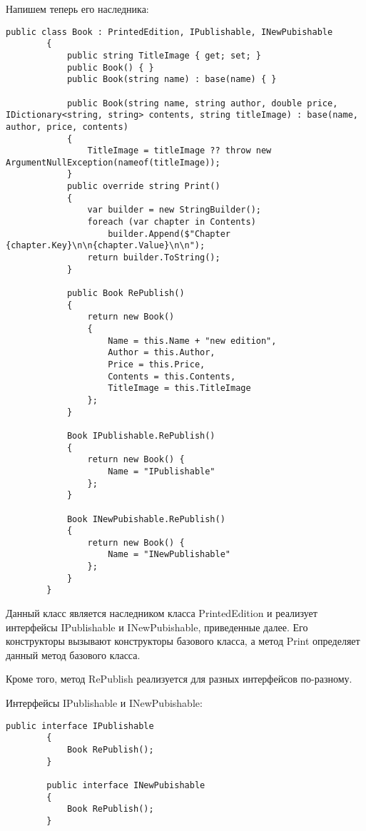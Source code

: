 \documentclass[a4paper,14pt]{extarticle}
\begin{document}
    Напишем теперь его наследника:

    \begin{lstlisting}[language={[Sharp]C}]
        public class Book : PrintedEdition, IPublishable, INewPubishable
        {
            public string TitleImage { get; set; }
            public Book() { }
            public Book(string name) : base(name) { } 

            public Book(string name, string author, double price, IDictionary<string, string> contents, string titleImage) : base(name, author, price, contents) 
            {
                TitleImage = titleImage ?? throw new ArgumentNullException(nameof(titleImage));
            }
            public override string Print()
            {
                var builder = new StringBuilder();
                foreach (var chapter in Contents)
                    builder.Append($"Chapter {chapter.Key}\n\n{chapter.Value}\n\n");
                return builder.ToString();
            }

            public Book RePublish()
            {
                return new Book()
                {
                    Name = this.Name + "new edition",
                    Author = this.Author,
                    Price = this.Price,
                    Contents = this.Contents,
                    TitleImage = this.TitleImage
                };
            }

            Book IPublishable.RePublish()
            {
                return new Book() {
                    Name = "IPublishable"
                };
            }

            Book INewPubishable.RePublish()
            {
                return new Book() {
                    Name = "INewPublishable"
                };
            }
        }
    \end{lstlisting}
    Данный класс является наследником класса PrintedEdition и реализует интерфейсы
    IPublishable и INewPubishable, приведенные далее. Его конструкторы вызывают
    конструкторы базового класса, а метод Print определяет данный метод базового
    класса.

    Кроме того, метод RePublish реализуется для разных интерфейсов по-разному.

    Интерфейсы IPublishable и INewPubishable:

    \begin{lstlisting}[language={[Sharp]C}]
        public interface IPublishable
        {
            Book RePublish();
        }

        public interface INewPubishable
        {
            Book RePublish();
        }
    \end{lstlisting}
\end{document}
